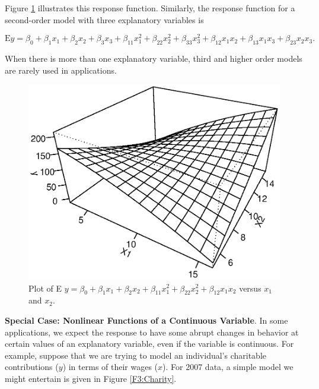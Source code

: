 Figure \ref{F3:Curvilinear} illustrates this response function.
Similarly, the response function for a second-order model with three
explanatory variables is

\begin{equation*}
\textrm{E} y = \beta_0 + \beta_1 x_1 + \beta_2 x_2 + \beta_3 x_3 +
\beta_{11} x_1^2 + \beta_{22} x_2^2 + \beta_{33} x_3^2 + \beta_{12}
x_1 x_2 + \beta_{13} x_1 x_3 + \beta_{23} x_2 x_3.
\end{equation*}

When there is more than one explanatory variable, third and higher
order models are rarely used in applications.


\begin{figure}[htp]
  \begin{center}
    \includegraphics[width=.6\textwidth]{Chapter3/F3Curvilinear.eps}
    \caption{\label{F3:Curvilinear} \small Plot of E $y = \beta_0 + \beta_1 x_1 + \beta_2 x_2 +
     \beta_{11} x_1^2 + \beta_{22} x_2^2 + \beta_{12} x_1 x_2$ versus
$x_1$ and $x_2$.}
  \end{center}
\end{figure}

\bigskip

\textbf{Special Case: Nonlinear Functions of a Continuous Variable}.
In some applications, we expect the response to have some abrupt
changes in behavior at certain values of an explanatory variable,
even if the variable is continuous. For example, suppose that we are
trying to model an individual's charitable contributions ($y$) in
terms of their wages ($x$). For 2007 data, a simple model we might
entertain is given in Figure \ref{F3:Charity}.


